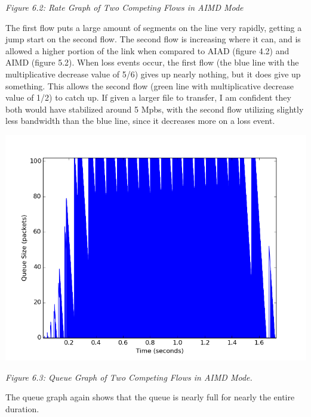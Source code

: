 \documentclass[11pt]{article}
\begin{document}
\centerline{\emph{Figure 6.2: Rate Graph of Two Competing Flows in AIMD Mode}}

The first flow puts a large amount of segments on the line very rapidly, getting a jump start on the second flow. The second flow is increasing where it can, and is allowed a higher portion of the link when compared to AIAD (figure 4.2) and AIMD (figure 5.2). When loss events occur, the first flow (the blue line with the multiplicative decrease value of 5/6) gives up nearly nothing, but it does give up something. This allows the second flow (green line with multiplicative decrease value of 1/2) to catch up. If given a larger file to transfer, I am confident they both would have stabilized around 5 Mpbs, with the second flow utilizing slightly less bandwidth than the blue line, since it decreases more on a loss event.


\includegraphics[width=17cm]{outputs/competingAIMD/competingAIMD_queue.png}

\centerline{\emph{Figure 6.3: Queue Graph of Two Competing Flows in AIMD Mode.}}

The queue graph again shows that the queue is nearly full for nearly the entire duration.




\end{document}
